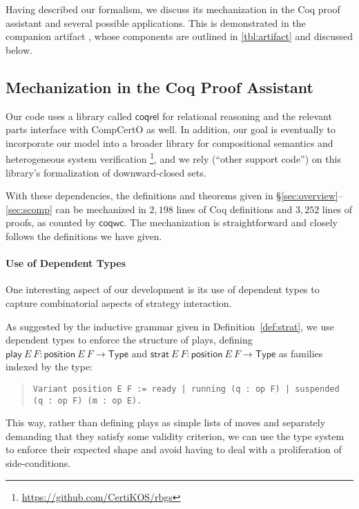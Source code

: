 \documentclass[acmsmall,nonacm]{acmart}
\newcommand{\kw}[1]{\ensuremath{ \mathsf{#1} }}
\begin{document}
Having described our formalism,
we discuss its mechanization in the Coq proof assistant
and several possible applications.
This is demonstrated in the companion artifact
\citep{compcertoe-artifact},
whose components
are outlined in \autoref{tbl:artifact} and discussed below.

\subsection{Mechanization in the Coq Proof Assistant} \label{sec:application:impl} %

Our code uses a library called $\kw{coqrel}$ \cite{coqrel}
for relational reasoning
and the relevant parts interface with CompCertO as well.
In addition,
our goal is eventually to incorporate our model
into a broader library for compositional semantics
and heterogeneous system verification%
\footnote{\url{https://github.com/CertiKOS/rbgs}}\!,
and we rely (``other support code'') on this library's formalization of
downward-closed sets.

With these dependencies,
the definitions and theorems 
given in \S\ref{sec:overview}--\ref{sec:scomp}
can be mechanized in $2{,}198$ lines of Coq definitions and
$3{,}252$ lines of proofs, as counted by $\kw{coqwc}$.
The mechanization
is straightforward and closely follows the definitions we have given.

\paragraph{Use of Dependent Types} %

One interesting aspect of our development is its use of dependent types
to capture combinatorial aspects of strategy interaction.

As suggested by the inductive grammar given in Definition~\ref{def:strat},
we use dependent types to enforce the structure of plays, defining
$\kw{play}\ E\ F : \kw{position}\ E\ F \rightarrow \kw{Type}$ and
$\kw{strat}\ E\ F : \kw{position}\ E\ F \rightarrow \kw{Type}$
as families indexed by the type:
\begin{quote}\footnotesize
\verb!Variant position E F := ready | running (q : op F) | suspended (q : op F) (m : op E).!
\end{quote}
This way,
rather than defining plays as simple lists of moves and
separately demanding that they satisfy some validity criterion,
we can use the type system to enforce their expected shape
and avoid having to deal with a proliferation of side-conditions.
\end{document}
